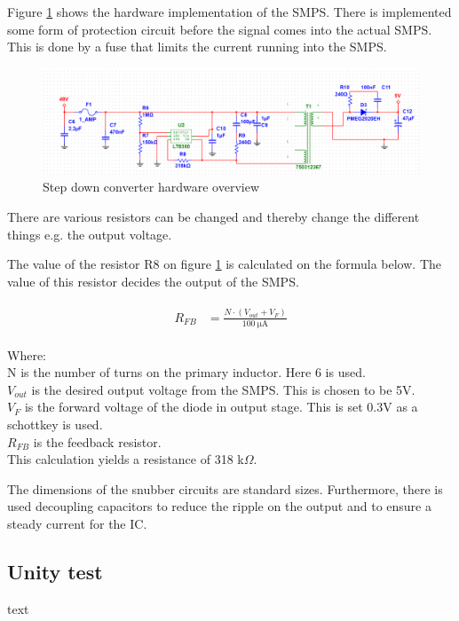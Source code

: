 Figure \ref{fig:SMPS_control} shows the hardware implementation of the SMPS. There is implemented some form of protection circuit before the signal comes into the actual SMPS. This is done by a fuse that limits the current running into the SMPS. 

\begin{figure}[H]
	\centering
	\includegraphics[width=0.7\linewidth]{Hardware/Pictures/SMPS_hw}
	\caption{Step down converter hardware overview}
	\label{fig:SMPS_control}
\end{figure}

There are various resistors can be changed and thereby change the different things e.g. the output voltage. 

The value of the resistor R8 on figure \ref{fig:SMPS_control} is calculated on the formula below. The value of this resistor decides the output of the SMPS.

\begin{align}
	\begin{split}
		R_{FB} &= \frac{N \cdot (V_{out}+V_F)}{\SI{100}{\micro \ampere}}
	\end{split}
\end{align}

Where:\\
N is the number of turns on the primary inductor. Here 6 is used. \\
$V_{out}$ is the desired output voltage from the SMPS. This is chosen to be 5V. \\
$V_F$ is the forward voltage of the diode in output stage. This is set 0.3V as a schottkey is used. \\
$R_{FB}$ is the feedback resistor. \\
This calculation yields a resistance of 318 k$\Omega$.

The dimensions of the snubber circuits are standard sizes. Furthermore, there is used decoupling capacitors to reduce the ripple on the output and to ensure a steady current for the IC.

\subsection{Unity test}
text
